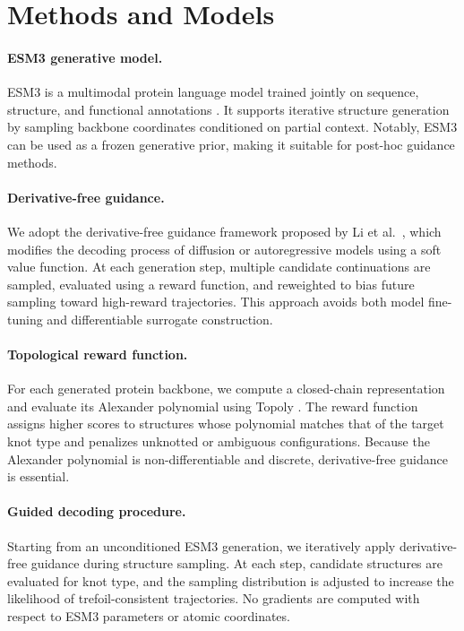 \documentclass{article}
\begin{document}
\section{Methods and Models}

\paragraph{ESM3 generative model.}
ESM3 is a multimodal protein language model trained jointly on sequence, structure, and functional annotations \cite{Hayes2025}.
It supports iterative structure generation by sampling backbone coordinates conditioned on partial context.
Notably, ESM3 can be used as a frozen generative prior, making it suitable for post-hoc guidance methods.

\paragraph{Derivative-free guidance.}
We adopt the derivative-free guidance framework proposed by Li et al.\ \cite{Li2024}, which modifies the decoding process of diffusion or autoregressive models using a soft value function.
At each generation step, multiple candidate continuations are sampled, evaluated using a reward function, and reweighted to bias future sampling toward high-reward trajectories.
This approach avoids both model fine-tuning and differentiable surrogate construction.

\paragraph{Topological reward function.}
For each generated protein backbone, we compute a closed-chain representation and evaluate its Alexander polynomial using Topoly \cite{Dabrowski-Tumanski2021}.
The reward function assigns higher scores to structures whose polynomial matches that of the target knot type and penalizes unknotted or ambiguous configurations.
Because the Alexander polynomial is non-differentiable and discrete, derivative-free guidance is essential.

\paragraph{Guided decoding procedure.}
Starting from an unconditioned ESM3 generation, we iteratively apply derivative-free guidance during structure sampling.
At each step, candidate structures are evaluated for knot type, and the sampling distribution is adjusted to increase the likelihood of trefoil-consistent trajectories.
No gradients are computed with respect to ESM3 parameters or atomic coordinates.
\end{document}

